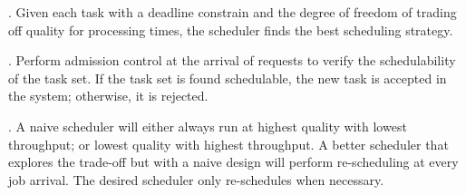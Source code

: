 . Given each task with a deadline constrain and the degree of
freedom of trading off quality for processing times, the scheduler finds the
best scheduling strategy.

. Perform admission control at the arrival of requests to
verify the schedulability of the task set. If the task set is found schedulable,
the new task is accepted in the system; otherwise, it is rejected.

. A naive scheduler will either always run at highest
quality with lowest throughput; or lowest quality with highest throughput. A
better scheduler that explores the trade-off but with a naive design will
perform re-scheduling at every job arrival. The desired scheduler only
re-schedules when necessary.


